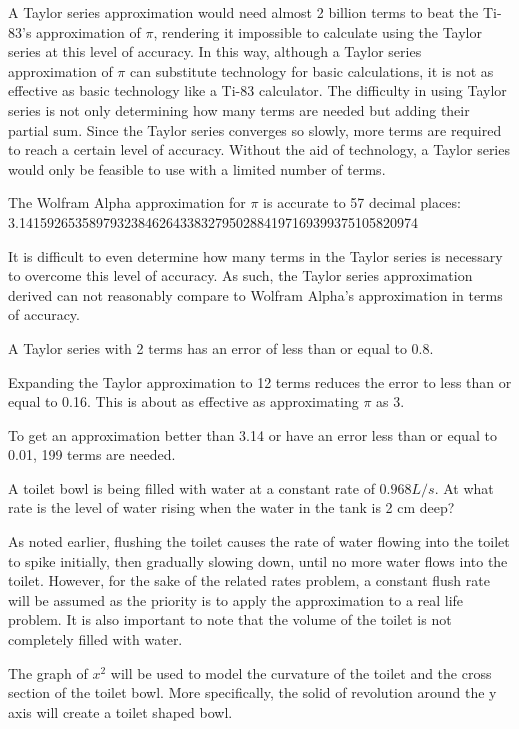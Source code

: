 A Taylor series approximation would need almost 2 billion terms to beat the Ti-83's approximation of \(\pi\), rendering it impossible to calculate using the Taylor series at this level of accuracy. In this way, although a Taylor series approximation of \(\pi\) can substitute technology for basic calculations, it is not as effective as basic technology like a Ti-83 calculator. The difficulty in using Taylor series is not only determining how many terms are needed but adding their partial sum. Since the Taylor series converges so slowly, more terms are required to reach a certain level of accuracy. Without the aid of technology, a Taylor series would only be feasible to use with a limited number of terms.

The Wolfram Alpha approximation for \(\pi\) is accurate to 57 decimal places: \\
3.141592653589793238462643383279502884197169399375105820974

It is difficult to even determine how many terms in the Taylor series is necessary to overcome this level of accuracy. As such, the Taylor series approximation derived can not reasonably compare to Wolfram Alpha's approximation in terms of accuracy.

A Taylor series with 2 terms has an error of less than or equal to 0.8.

Expanding the Taylor approximation to 12 terms reduces the error to less than or equal to 0.16. This is about as effective as approximating \(\pi\) as 3.

To get an approximation better than 3.14 or have an error less than or equal to 0.01, 199 terms are needed. 

A toilet bowl is being filled with water at a constant rate of \(0.968 L/s\). At what rate is the level of water rising when the water in the tank is 2 cm deep?


As noted earlier, flushing the toilet causes the rate of water flowing into the toilet to spike initially, then gradually slowing down, until no more water flows into the toilet. However, for the sake of the related rates problem, a constant flush rate will be assumed as the priority is to apply the approximation to a real life problem. It is also important to note that the volume of the toilet is not completely filled with water.  

The graph of \(x^{2}\) will be used to model the curvature of the toilet and the cross section of the toilet bowl. More specifically, the solid of revolution around the y axis will create a toilet shaped bowl. 


